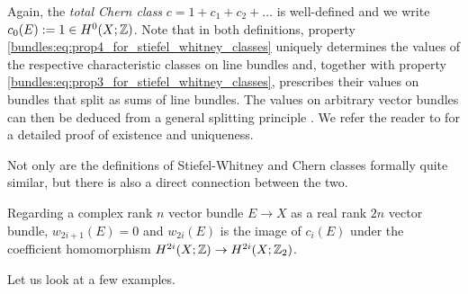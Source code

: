 Again, the \textit{total Chern class} $c = 1 + c_1 + c_2 + \ldots$ is well-defined and we write \linebreak $c_0(E) := 1 \in H^0(X;\mathbb{Z})$. Note that in both definitions, property \ref{bundles:eq:prop4_for_stiefel_whitney_classes} uniquely determines the values of the respective characteristic classes on line bundles and, together with property \ref{bundles:eq:prop3_for_stiefel_whitney_classes}, prescribes their values on bundles that split as sums of line bundles. \linebreak The values on arbitrary vector bundles can then be deduced from a general splitting principle \cite[Prop. 3.3]{Hatcher2003VectorBundles}. We refer the reader to \cite{Hatcher2003VectorBundles} for a detailed proof of existence and uniqueness.

Not only are the definitions of Stiefel-Whitney and Chern classes formally quite similar, but there is also a direct connection between the two.

\begin{proposition}
    \label{bundles:prop:connection_chern_stiefel_whitney_classes}
    Regarding a complex rank $n$ vector bundle $E \to X$ as a real rank $2n$ vector bundle, $w_{2i +1}(E) = 0$ and $w_{2i}(E)$ is the image of $c_i(E)$ under the coefficient homomorphism $H^{2i}(X;\mathbb{Z}) \to H^{2i}(X;\mathbb{Z}_2)$.  
\end{proposition}

Let us look at a few examples.

